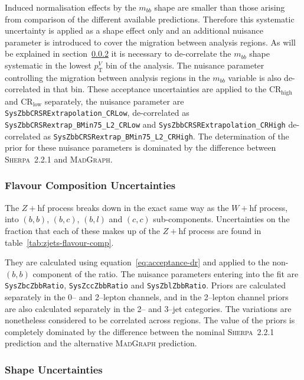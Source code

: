 Induced normalisation effects by the $m_{bb}$ shape are smaller than those
arising from comparison of the different available predictions. Therefore this
systematic uncertainty is applied as a shape effect only and an additional
nuisance parameter is introduced to cover the migration between analysis
regions. As will be explained in section~\ref{sec:zjets-shapes} it is necessary
to de-correlate the $m_{bb}$ shape systematic in the lowest $p_{\mathrm{T}}^V$
bin of the analysis. The nuisance parameter controlling the migration between
analysis regions in the $m_{bb}$ variable is also de-correlated in that bin.
These acceptance uncertainties are applied to the CR$_{\text{high}}$ and
CR$_{\text{low}}$ separately, the nuisance parameter are
\texttt{SysZbbCRSRExtrapolation\_CRLow}, de-correlated as
\texttt{SysZbbCRSRextrap\_BMin75\_L2\_CRLow} and
\texttt{SysZbbCRSRExtrapolation\_CRHigh} de-correlated as
\texttt{SysZbbCRSRextrap\_BMin75\_L2\_CRHigh}. The determination of the prior
for these nuisance parameters is dominated by the difference between
\textsc{Sherpa}~2.2.1 and \textsc{MadGraph}.

\subsubsection{Flavour Composition Uncertainties}

The $Z+$hf process breaks down in the exact same way as the $W+$hf process, into
$(b,b)$, $(b, c)$, $(b, l)$ and $(c, c)$ sub-components. Uncertainties on the
fraction that each of these makes up of the $Z+$hf process are found in
table~\ref{tab:zjets-flavour-comp}.

They are calculated using equation~\ref{eq:acceptance-dr} and applied to the
non-$(b, b)$ component of the ratio. The nuisance parameters entering into the
fit are \texttt{SysZbcZbbRatio}, \texttt{SysZccZbbRatio} and
\texttt{SysZblZbbRatio}. Priors are calculated separately in the 0-- and
2--lepton channels, and in the 2--lepton channel priors are also calculated
separately in the 2-- and 3--jet categories. The variations are nonetheless
considered to be correlated across regions. The value of the priors is
completely dominated by the difference between the nominal \textsc{Sherpa}~2.2.1
prediction and the alternative \textsc{MadGraph} prediction.

\subsubsection{Shape Uncertainties}
\label{sec:zjets-shapes}

